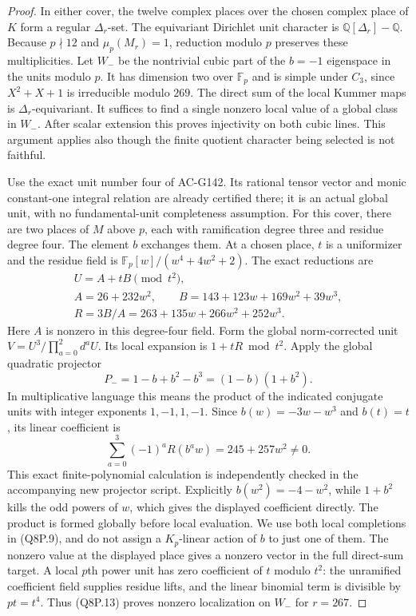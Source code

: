 \begin{proof}
In either cover, the twelve complex places over the chosen complex
place of $K$ form a regular $\Delta_r$-set.
The equivariant Dirichlet unit character is
$\mathbb Q[\Delta_r]-\mathbb Q$.
Because $p\nmid12$ and $\mu_p(M_r)=1$, reduction modulo $p$
preserves these multiplicities.
Let $W_-$ be the nontrivial cubic part of the $b=-1$ eigenspace
in the units modulo $p$.
It has dimension two over $\mathbb F_p$ and is simple under $C_3$,
since $X^2+X+1$ is irreducible modulo $269$.
The direct sum of the local Kummer maps is $\Delta_r$-equivariant.
It suffices to find a single nonzero local value of a global
class in $W_-$.
After scalar extension this proves injectivity on both cubic lines.
This argument applies also though the finite quotient character
being selected is not faithful.

Use the exact unit number four of AC-G142.
Its rational tensor vector and monic constant-one integral relation
are already certified there; it is an actual global unit, with no
fundamental-unit completeness assumption.
For this cover, there are two places of $M$ above $p$, each with
ramification degree three and residue degree four.
The element $b$ exchanges them.
At a chosen place, $t$ is a uniformizer and the residue field is
$\mathbb F_p[w]/(w^4+4w^2+2)$.
The exact reductions are
\[
 \begin{gathered}
 U=A+tB\pmod{t^2},\\
 A=26+232w^2,\qquad
 B=143+123w+169w^2+39w^3,\\
 R=3B/A=263+135w+266w^2+252w^3.
 \end{gathered}
 \tag{Q8P.11}
\]
Here $A$ is nonzero in this degree-four field.
Form the global norm-corrected unit
$V=U^3/\prod_{a=0}^2d^aU$.
Its local expansion is $1+tR\bmod t^2$.
Apply the global quadratic projector
\[
                  P_-=1-b+b^2-b^3=(1-b)(1+b^2).
 \tag{Q8P.12}
\]
In multiplicative language this means the product of the indicated
conjugate units with integer exponents $1,-1,1,-1$.
Since $b(w)=-3w-w^3$ and $b(t)=t$, its linear coefficient is
\[
 \sum_{a=0}^3(-1)^aR(b^a w)=245+257w^2\ne0.
 \tag{Q8P.13}
\]
This exact finite-polynomial calculation is independently checked
in the accompanying new projector script.
Explicitly $b(w^2)=-4-w^2$, while $1+b^2$ kills the odd powers
of $w$, which gives the displayed coefficient directly.
The product is formed globally before local evaluation.
We use both local completions in (Q8P.9), and do not assign a
$K_p$-linear action of $b$ to just one of them.
The nonzero value at the displayed place gives a nonzero vector
in the full direct-sum target.
A local $p$th power unit has zero coefficient of $t$ modulo $t^2$:
the unramified coefficient field supplies residue lifts, and
the linear binomial term is divisible by $pt=t^4$.
Thus (Q8P.13) proves nonzero localization on $W_-$ for $r=267$.


\end{proof}
